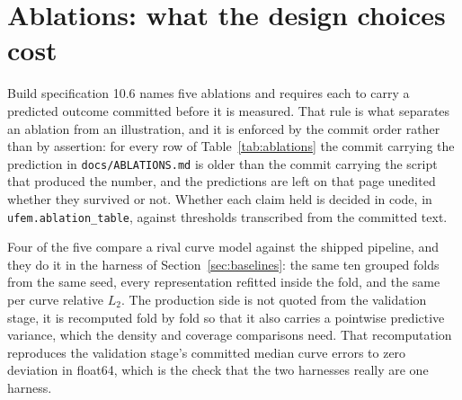 \documentclass[11pt,a4paper]{article}
\begin{document}
\section{Ablations: what the design choices cost}
\label{sec:ablations}
Build specification 10.6 names five ablations and requires each to carry a predicted outcome
committed before it is measured. That rule is what separates an ablation from an illustration,
and it is enforced by the commit order rather than by assertion: for every row of
Table~\ref{tab:ablations} the commit carrying the prediction in \texttt{docs/ABLATIONS.md} is
older than the commit carrying the script that produced the number, and the predictions are left
on that page unedited whether they survived or not. Whether each claim held is decided in code,
in \texttt{ufem.ablation\_table}, against thresholds transcribed from the committed text.

Four of the five compare a rival curve model against the shipped pipeline, and they do it in the
harness of Section~\ref{sec:baselines}: the same ten grouped folds from the same seed, every
representation refitted inside the fold, and the same per curve relative $L_2$. The production
side is not quoted from the validation stage, it is recomputed fold by fold so that it also
carries a pointwise predictive variance, which the density and coverage comparisons need. That
recomputation reproduces the validation stage's committed median curve errors to zero deviation
in float64, which is the check that the two harnesses really are one harness.

\begin{table}[tbp]
\centering
\caption{The five ablations of build specification 10.6. Each row's headline metric is the one
its own prediction was written about; the final column counts how many of that ablation's
committed claims survived contact with the measurement, and the text below says which. Rows 2 to
4 are measured out of fold in the harness of Section~\ref{sec:baselines}; row 5 is a subsampling
study on the same 198 runs.}
\label{tab:ablations}
\footnotesize
\setlength{\tabcolsep}{4pt}

\end{table}
\end{document}

